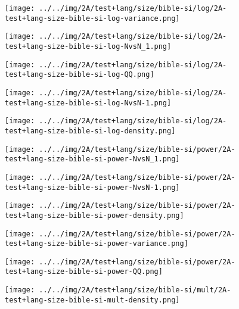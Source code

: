 \begin{figure}[H]
\centering	\texttt{[image: ../../img/2A/test+lang/size/bible-si/log/2A-test+lang-size-bible-si-log-variance.png]}
\end{figure}
\begin{figure}[H]
\centering	\texttt{[image: ../../img/2A/test+lang/size/bible-si/log/2A-test+lang-size-bible-si-log-NvsN\_1.png]}
\end{figure}
\begin{figure}[H]
\centering	\texttt{[image: ../../img/2A/test+lang/size/bible-si/log/2A-test+lang-size-bible-si-log-QQ.png]}
\end{figure}
\begin{figure}[H]
\centering	\texttt{[image: ../../img/2A/test+lang/size/bible-si/log/2A-test+lang-size-bible-si-log-NvsN-1.png]}
\end{figure}
\begin{figure}[H]
\centering	\texttt{[image: ../../img/2A/test+lang/size/bible-si/log/2A-test+lang-size-bible-si-log-density.png]}
\end{figure}
\begin{figure}[H]
\centering	\texttt{[image: ../../img/2A/test+lang/size/bible-si/power/2A-test+lang-size-bible-si-power-NvsN\_1.png]}
\end{figure}
\begin{figure}[H]
\centering	\texttt{[image: ../../img/2A/test+lang/size/bible-si/power/2A-test+lang-size-bible-si-power-NvsN-1.png]}
\end{figure}
\begin{figure}[H]
\centering	\texttt{[image: ../../img/2A/test+lang/size/bible-si/power/2A-test+lang-size-bible-si-power-density.png]}
\end{figure}
\begin{figure}[H]
\centering	\texttt{[image: ../../img/2A/test+lang/size/bible-si/power/2A-test+lang-size-bible-si-power-variance.png]}
\end{figure}
\begin{figure}[H]
\centering	\texttt{[image: ../../img/2A/test+lang/size/bible-si/power/2A-test+lang-size-bible-si-power-QQ.png]}
\end{figure}
\begin{figure}[H]
\centering	\texttt{[image: ../../img/2A/test+lang/size/bible-si/mult/2A-test+lang-size-bible-si-mult-density.png]}
\end{figure}
